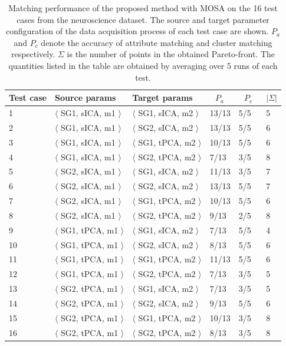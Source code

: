 \begin{table}[tbh]
\begin{center}
\begin{tabular}{l|l|l|l|l|l}
\hline
Test case & Source params & Target params & $~~~P_a~~~$ & $~~~P_c~~~$ & $|\Sigma|$\\
\hline
1		&	$\langle$	SG1, sICA, m1	$\rangle$	&	$\langle$	SG1, sICA, m2	$\rangle$	&		13/13	&	5/5	&	5	 \\
2		&	$\langle$	SG1, sICA, m1	$\rangle$	&	$\langle$	SG2, sICA, m2	$\rangle$	&		13/13	&	5/5	&	6	 \\
3		&	$\langle$	SG1, sICA, m1	$\rangle$	&	$\langle$	SG1, tPCA, m2	$\rangle$	&		10/13	&	5/5	&	6	 \\
4		&	$\langle$	SG1, sICA, m1	$\rangle$	&	$\langle$	SG2, tPCA, m2	$\rangle$	&		7/13	&	3/5	&	8	 \\
5		&	$\langle$	SG2, sICA, m1	$\rangle$	&	$\langle$	SG1, sICA, m2	$\rangle$	&		11/13	&	3/5	&	7	 \\
6		&	$\langle$	SG2, sICA, m1	$\rangle$	&	$\langle$	SG2, sICA, m2	$\rangle$	&		13/13	&	5/5	&	7	 \\
7		&	$\langle$	SG2, sICA, m1	$\rangle$	&	$\langle$	SG1, tPCA, m2	$\rangle$	&		10/13	&	5/5	&	6	 \\
8		&	$\langle$	SG2, sICA, m1	$\rangle$	&	$\langle$	SG2, tPCA, m2	$\rangle$	&		9/13	&	2/5	&	8	 \\
9		&	$\langle$	SG1, tPCA, m1	$\rangle$	&	$\langle$	SG1, sICA, m2	$\rangle$	&		7/13	&	5/5	&	4	 \\
10		&	$\langle$	SG1, tPCA, m1	$\rangle$	&	$\langle$	SG2, sICA, m2	$\rangle$	&		8/13	&	5/5	&	6	 \\
11		&	$\langle$	SG1, tPCA, m1	$\rangle$	&	$\langle$	SG1, tPCA, m2	$\rangle$	&		11/13	&	5/5	&	6	 \\
12		&	$\langle$	SG1, tPCA, m1	$\rangle$	&	$\langle$	SG2, tPCA, m2	$\rangle$	&		7/13	&	3/5	&	5	 \\
13		&	$\langle$	SG2, tPCA, m1	$\rangle$	&	$\langle$	SG1, sICA, m2	$\rangle$	&		7/13	&	3/5	&	5	 \\
14		&	$\langle$	SG2, tPCA, m1	$\rangle$	&	$\langle$	SG2, sICA, m2	$\rangle$	&		9/13	&	5/5	&	6	 \\
15		&	$\langle$	SG2, tPCA, m1	$\rangle$	&	$\langle$	SG1, tPCA, m2	$\rangle$	&		10/13	&	3/5	&	8	 \\
16		&	$\langle$	SG2, tPCA, m1	$\rangle$	&	$\langle$	SG2, tPCA, m2	$\rangle$	&		8/13	&	3/5	&	8	 \\
\hline
\end{tabular}
\end{center}
\caption{\label{tbl:nemo_perf} Matching performance of the proposed method with MOSA on the 16 test cases from the neuroscience dataset. The source and target parameter configuration of the data acquisition process of each test case are shown. $P_a$ and $P_c$ denote the accuracy of attribute matching and cluster matching respectively. $\Sigma$ is the number of points in the obtained Pareto-front. The quantities listed in the table are obtained by averaging over 5 runs of each test.}
\end{table}

